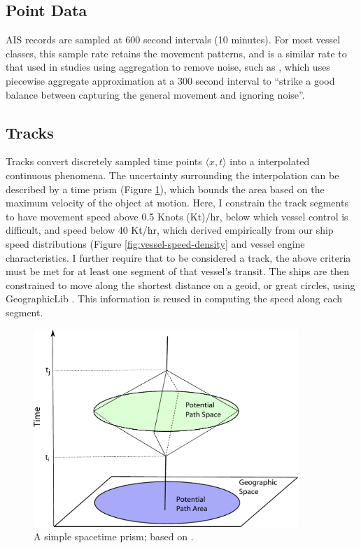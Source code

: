 \subsection{Point Data}

AIS records are sampled at 600 second intervals (10 minutes). For most vessel classes, this sample rate retains the movement patterns, and is a similar rate to that used in studies using aggregation to remove noise, such as \cite{Vries2009}, which uses piecewise aggregate approximation at a 300 second interval to ``strike a good balance between capturing the general movement and ignoring noise''. %


\subsection{Tracks}

Tracks convert discretely sampled time points $\langle x, t \rangle$ into a interpolated continuous phenomena. The uncertainty surrounding the interpolation can be described by a time prism (Figure \ref{fig:time-prism}), which bounds the area based on the maximum velocity of the object at motion. Here, I constrain the track segments to have movement speed above 0.5 Knots (Kt)/hr, below which vessel control is difficult, and speed below 40 Kt/hr, which derived empirically from our ship speed distributions (Figure \ref{fig:vessel-speed-density} and vessel engine characteristics.  I further require that to be considered a track, the above criteria must be met for at least one segment of that vessel's transit. The ships are then constrained to move along the shortest distance on a geoid, or great circles, using GeographicLib \citep{karney2012algorithms}. This information is reused in computing the speed along each segment. %

\begin{figure}[h!]
  \centering
    \includegraphics[width=100mm]{figures/time-geography-prism.pdf}
  \caption[A simple space{\textendash}time prism]{A simple space{\textendash}time prism; based on \cite{Wu2002}.}
  \label{fig:time-prism}
\end{figure}


